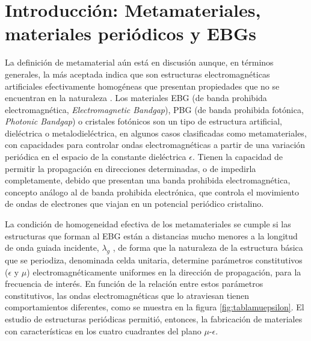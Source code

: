 
\section{Introducción: Metamateriales, materiales periódicos y EBGs}
\label{sec_resenia_metamateriales}


La definición de metamaterial aún está en discusión aunque, en términos generales, la más aceptada indica que son estructuras electromagnéticas artificiales efectivamente homogéneas que presentan propiedades que no se encuentran en la naturaleza \cite{Caloz:ElectromagneticMetamaterials}. Los materiales EBG (de banda prohibida electromagnética, \textit{Electromagnetic Bandgap}), PBG (de banda prohibida fotónica, \textit{Photonic Bandgap}) o cristales fotónicos son un tipo de estructura artificial, dieléctrica o metalodieléctrica, en algunos casos clasificadas como metamateriales, con capacidades para controlar ondas electromagnéticas \cite{Engheta:Metamaterials} a partir de una variación periódica en el espacio de la constante dieléctrica $\epsilon$. Tienen la capacidad de permitir la propagación en direcciones determinadas, o de impedirla completamente, debido que presentan una banda prohibida electromagnética, concepto análogo al de banda prohibida electrónica, que controla el movimiento de ondas de electrones que viajan en un potencial periódico cristalino.

La condición de homogeneidad efectiva de los metamateriales se cumple si las estructuras que forman al EBG están a distancias mucho menores a la longitud de onda guiada incidente, $\lambda_g$ \cite{Caloz:ElectromagneticMetamaterials}, de forma que la naturaleza de la estructura básica que se periodiza, denominada celda unitaria, determine parámetros constitutivos ($\epsilon$ y $\mu$) electromagnéticamente uniformes en la dirección de propagación, para la frecuencia de interés. En función de la relación entre estos parámetros constitutivos, las ondas electromagnéticas que lo atraviesan tienen comportamientos diferentes, como se muestra en la figura \ref{fig:tablamuepsilon}. El estudio de estructuras periódicas permitió, entonces, la fabricación de materiales con características en los cuatro cuadrantes del plano $\mu$-$\epsilon$.

